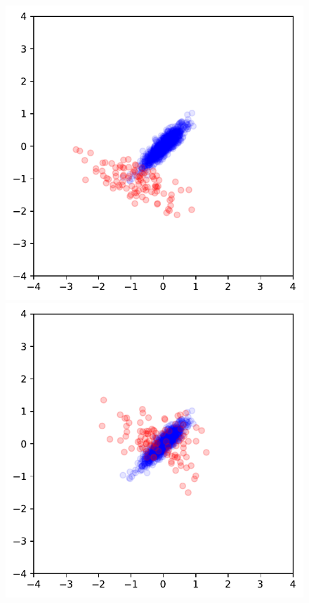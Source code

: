 \documentclass[letterpaper]{article}
\providecommand{\1}{\mathbf{1}}
\providecommand{\0}{\mathbf{0}}
\begin{document}
\begin{enumerate}
    \begin{figure}
        \centering
        \begin{minipage}{.3\textwidth}
         \includegraphics[width=.9\textwidth]{img/gan1}
        \end{minipage}
        \begin{minipage}{.3\textwidth}
         \includegraphics[width=.9\textwidth]{img/gan2}
        \end{minipage}

\end{figure}
\end{enumerate}
\end{document}

